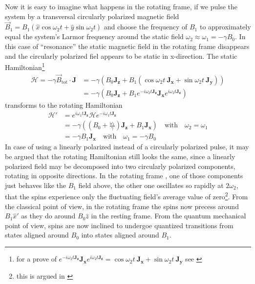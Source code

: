 \documentclass[11.5pt,a4paper]{article}
\begin{document}
Now it is easy to imagine what happens in the rotating frame, if we pulse the system by a transversal circularly polarized magnetic field $\vec{B}_1 = B_1 (\hat{x} \cos \omega_2 t + \hat{y} \sin \omega_2 t)$ and choose the frequency of $B_1$ to approximately equal the system's Larmor frequency around the static field $\omega_2 \approx \omega_1 = - \gamma B_0$. In this case of ``resonance'' the static magnetic field in the rotating frame disappears and the circularly polarized fiel appears to be static in x-direction. The static Hamiltonian\footnote{ for a prove of $e^{-i \omega_2 t \mathbf{J_z}} \mathbf{J_x} e^{i \omega_2 t \mathbf{J_z}} = \cos \omega_2 t \ \mathbf{J_x} + \sin \omega_2 t \ \mathbf{J_y}$ see \cite[chap 2.6 Exponential Operators, p. 27f]{slichter}}
\begin{align}
 \mathcal{H} = -\gamma \vec{B}_\text{tot} \cdot \mathbf{J}  & = - \gamma \left( B_0 \mathbf{J_z} + B_1 ( \cos \omega_2 t \ \mathbf{J_x} + \sin \omega_2 t \ \mathbf{J_y} ) \right) \\
  & = - \gamma \left( B_0 \mathbf{J_z} + B_1 e^{-i \omega_2 t \mathbf{J_z}} \mathbf{J_x} e^{i \omega_2 t \mathbf{J_z}} \right)
\end{align}
transforms to the rotating Hamiltonian
\begin{align}
\mathcal{H'} & = e^{i \omega_1 t \mathbf{J_z}} \mathcal{H} e^{-i \omega_1 t \mathbf{J_z}} \\
& = -\gamma \left( (B_0 + \frac{\omega_1}{\gamma}) \mathbf{J_z} + B_1 \mathbf{J_x} \right)  \quad \text{with} \quad \omega_2 = \omega_1\\
  & = - \gamma B_1 \mathbf{J_x} \quad \text{with} \quad \omega_1 = - \gamma B_0 
\end{align}
In case of using a linearly polarized instead of a circularly polarized pulse, it may be argued that the rotating Hamiltonian still looks the same, since a linearly polarized field may be decomposed into two circularly polarized components, rotating in opposite directions. In the rotating frame , one of those components just behaves like the $B_1$ field above, the other one oscillates so rapidly at $2\omega_2$, that the spins experience only the fluctuating field's average value of zero\footnote{this is argued in \cite[chap. 4.2.2 The resonant frequency field, p.111f]{ox-nmr}}. From the classical point of view, in the rotating frame the spins now precess around $B_1 \hat{x}'$ as they do around $B_0 \hat{z}$ in the resting frame. From the quantum mechanical point of view, spins are now inclined to undergoe quantized transitions from states aligned around $B_0$ into states aligned around $B_1$.
\end{document}
